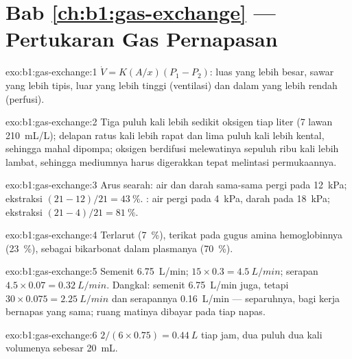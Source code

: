 \section*{Bab \ref{ch:b1:gas-exchange} --- Pertukaran Gas Pernapasan}

\begin{solution}{exo:b1:gas-exchange:1}
$\dot V = K(A/x)(P_1 - P_2)$: luas yang lebih besar, sawar yang lebih
tipis,  luar yang lebih tinggi (ventilasi) dan  dalam yang lebih rendah (perfusi).
\end{solution}

\begin{solution}{exo:b1:gas-exchange:2}
Tiga puluh kali lebih sedikit oksigen tiap liter (\qty{7}{} lawan
\qty{210}{mL/L}); delapan ratus kali lebih rapat dan lima puluh kali
lebih kental, sehingga mahal dipompa; oksigen berdifusi melewatinya
sepuluh ribu kali lebih lambat, sehingga mediumnya harus digerakkan
tepat melintasi permukaannya.
\end{solution}

\begin{solution}{exo:b1:gas-exchange:3}
Arus searah: air dan darah sama-sama pergi pada \qty{12}{kPa};
ekstraksi $(21 - 12)/21 = \qty{43}{\%}$. : air pergi pada
\qty{4}{kPa}, darah pada \qty{18}{kPa}; ekstraksi $(21 - 4)/21 =
\qty{81}{\%}$.
\end{solution}

\begin{solution}{exo:b1:gas-exchange:4}
Terlarut (\qty{7}{\%}), terikat pada gugus amina hemoglobinnya
(\qty{23}{\%}), sebagai bikarbonat dalam plasmanya (\qty{70}{\%}).
\end{solution}

\begin{solution}{exo:b1:gas-exchange:5}
Semenit \qty{6.75}{L/min};  $15\times 0.3 = \qty{4.5}{L/min}$;
serapan $4.5\times 0.07 = \qty{0.32}{L/min}$. Dangkal: semenit
\qty{6.75}{L/min} juga, tetapi  $30\times 0.075 =
\qty{2.25}{L/min}$ dan serapannya \qty{0.16}{L/min} --- separuhnya,
bagi kerja bernapas yang sama; ruang matinya dibayar pada tiap napas.
\end{solution}

\begin{solution}{exo:b1:gas-exchange:6}
$2/(6\times 0.75) = \qty{0.44}{L}$ tiap jam, dua puluh dua kali
volumenya sebesar \qty{20}{mL}.
\end{solution}

